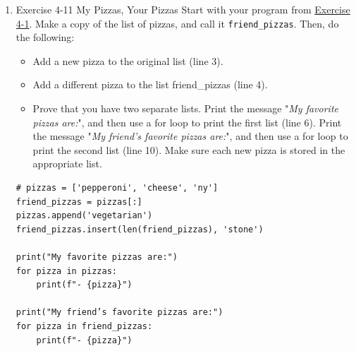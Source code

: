 \documentclass[10pt]{book}
\begin{document}
\begin{enumerate}
\begin{verbatim}
    # list odd, sublist odd
    elif n_items%2 != 0 and n_subitems%2 != 0:
        mid_point = (n_items + 1) / 2
        i_start = mid_point - ((n_subitems-1)/2)

    i_start = int(i_start - 1)
    i_end = i_start + n_subitems
    isublist = ilist[i_start:i_end]
    return isublist


print("\nThe 3 items in the middle are:")
isublist = sublist_even(t_players_1, 3)
for i in isublist:
    print(i)

print("\nThe last 3 items are:")
for i in t_players_1[-3:]:
    print(i)
\end{verbatim}

\label{org580d36f}
\begin{verbatim}
This exercise uses the object 't_players_1'
['Rafa', 'Roger', 'Novak', 'Andy', 'Stan', 'Jannik', 'Carlos']

The first 3 items of the list are:
Rafa
Roger
Novak

The 3 items in the middle are:
Novak
Andy
Stan

The last 3 items are:
Stan
Jannik
Carlos
\end{verbatim}
\item Exercise 4-11 My Pizzas, Your Pizzas
\label{sec:org499989a}
Start with your program from \hyperref[sec:org8bf0860]{Exercise 4-1}. Make a copy of the list of pizzas, and call it \texttt{friend\_pizzas}. Then, do the following:

\begin{itemize}
\item Add a new pizza to the original list (line 3).
\item Add a different pizza to the list friend\_pizzas (line 4).
\item Prove that you have two separate lists. Print the message "\emph{My favorite pizzas are:}", and then use a for loop to print the first list (line 6). Print the message "\emph{My friend’s favorite pizzas are:}", and then use a for loop to print the second list (line 10). Make sure each new pizza is stored in the appropriate list.
\end{itemize}
\begin{verbatim}
# pizzas = ['pepperoni', 'cheese', 'ny']
friend_pizzas = pizzas[:]
pizzas.append('vegetarian')
friend_pizzas.insert(len(friend_pizzas), 'stone')

print("My favorite pizzas are:")
for pizza in pizzas:
    print(f"- {pizza}")

print("My friend’s favorite pizzas are:")
for pizza in friend_pizzas:
    print(f"- {pizza}")
\end{verbatim}


\end{enumerate}
\end{document}
